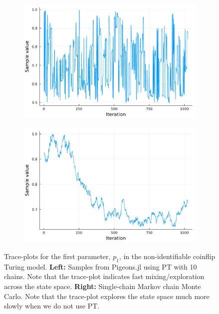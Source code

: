 \begin{figure}[t]
    \centering
    \begin{subfigure}{0.45\textwidth}
      \centering
      \includegraphics[width=\textwidth]{img/trace_density_plots_pt.pdf}
    \end{subfigure}
    \begin{subfigure}{0.45\textwidth}
      \centering
      \includegraphics[width=\textwidth]{img/trace_density_plots_single_chain.pdf}
    \end{subfigure}
    \caption{
        Trace-plots for the first parameter, $p_1$, in the 
        non-identifiable coinflip Turing model.
        \textbf{Left:} Samples from Pigeons.jl using PT with 10 chains. Note that the 
        trace-plot indicates fast mixing/exploration across the state space.
        \textbf{Right:} Single-chain Markov chain Monte Carlo. Note that the 
        trace-plot explores the state space much more slowly when we do not use PT.
    }
    \label{fig:trace_density_plots}
\end{figure}


